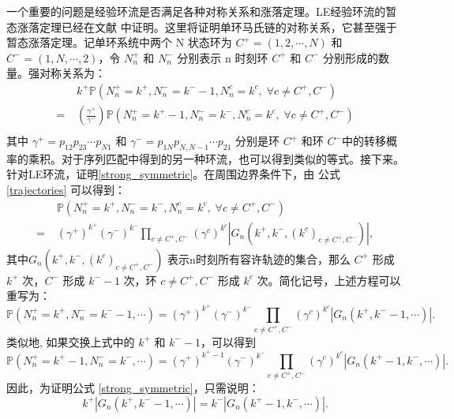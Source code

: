 
一个重要的问题是经验环流是否满足各种对称关系和涨落定理。LE经验环流的暂态涨落定理已经在文献 \cite{andrieux2007network} 中证明。这里将证明单环马氏链的对称关系，它甚至强于暂态涨落定理。记单环系统中两个 N 状态环为  $C^+ = (1,2,\cdots,N)$ 和 $C^- = (1,N,\cdots,2)$，令 $N^+_n$ 和 $N^-_n$ 分别表示 n 时刻环  $C^+$ 和 $C^-$ 分别形成的数量。强对称关系为：
\begin{align} \label{strong_symmetric}
    &\;k^+ \mathbb{P}\left(N^+_n=k^+,N^-_n=k^- -1,N^c_n=k^c,\;\forall c\neq C^+,C^-\right)\\
    =&\; \left(\frac{\gamma^+}{\gamma^-}\right)\mathbb{P}\left(N^+_n=k^+ -1,N^-_n=k^-,N^c_n=k^c,\;\forall c\neq C^+,C^-\right)\\
\end{align}
其中 $\gamma^+ = p_{12}p_{23}\cdots p_{N1}$ 和 $\gamma^- = p_{1N}p_{N,N-1}\cdots p_{21}$ 分别是环 $C^+$ 和环 $C^-$中的转移概率的乘积。对于序列匹配中得到的另一种环流，也可以得到类似的等式\cite{pietzonka2021cycle}。接下来。针对LE环流，证明\ref{strong_symmetric}。在周围边界条件下，由
公式 \eqref{trajectories} 可以得到：
\begin{align*}
    &\;\mathbb{P}\left(N^+_n=k^+,N^-_n=k^-,N^c_n=k^c,\;\forall c\neq C^+,C^-\right)\\
    =&\; (\gamma^+)^{k^+}(\gamma^-)^{k^-}\prod_{c\neq C^+,C^-}
    \left(\gamma^c\right)^{k^c}\left|G_n(k^+,k^-,(k^c)_{c\neq C^+,C^-})\right|,
\end{align*}
其中$G_n(k^+,k^-,(k^c)_{c\neq C^+,C^-})$ 表示n时刻所有容许轨迹的集合，那么 $C^+$ 形成 $k^+$ 次，$C^-$ 形成 $k^- -1$ 次，环 $c\neq C^+,C^-$ 形成 $k^c$ 次。简化记号，上述方程可以重写为：
\begin{equation}\label{temp1}
    \mathbb{P}\left(N^+_n=k^+,N^-_n=k^- -1,\cdots\right)
    = (\gamma^+)^{k^+}(\gamma^-)^{k^-}\prod_{c\neq C^+,C^-}\left(\gamma^c\right)^{k^c}|G_n(k^+,k^- -1,\cdots)|.
\end{equation}
类似地, 如果交换上式中的 $k^+$ 和 $k^- -1$，可以得到
\begin{equation}\label{temp2}
\mathbb{P}\left(N^+_n=k^+ -1,N^-_n=k^-,\cdots\right)
= (\gamma^+)^{k^+ -1}(\gamma^-)^{k^-}\prod_{c\neq C^+,C^-}\left(\gamma^c\right)^{k^c}|G_n(k^+ -1,k^-,\cdots)|.
\end{equation}
因此，为证明公式 \ref{strong_symmetric}，只需说明：
\begin{equation} \label{equal0}
    k^+ |G_n(k^+, k^- -1, \cdots)| = k^-|G_n(k^+ -1,k^-,\cdots)|.
\end{equation}

